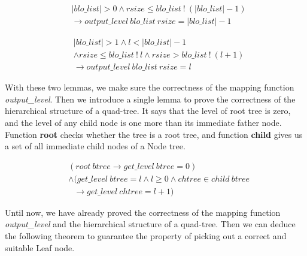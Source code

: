 \begin{lemma} 
\end{lemma}
\vspace{-7pt}
{\footnotesize
\begin{align*}
&\vert blo\_list \vert > 0 \wedge rsize \leq blo\_list\ !\ (\vert blo\_list \vert - 1) \\
&\longrightarrow output\_level\ blo\_list\ rsize = \vert blo\_list \vert - 1
\end{align*}
}
\vspace{-12pt}	

\begin{lemma} 
\end{lemma}
\vspace{-7pt}
{\footnotesize
\begin{align*}
&\vert blo\_list \vert > 1 \wedge l < \vert blo\_list \vert - 1 \\
&\wedge rsize \leq blo\_list\ !\ l \wedge rsize > blo\_list\ !\ (l + 1) \\
&\longrightarrow output\_level\ blo\_list\ rsize = l
\end{align*}
}
\vspace{-12pt}

With these two lemmas, we make sure the correctness of the mapping function \emph{output\_level}. Then we introduce a single lemma to prove the correctness of the hierarchical structure of a quad-tree. It says that the level of root tree is zero, and the level of any child node is one more than its immediate father node. Function \textbf{root} checks whether the tree is a root tree, and function \textbf{child} gives us a set of all immediate child nodes of a Node tree.

\begin{lemma} 
\end{lemma}
\vspace{-7pt}
{\footnotesize
\begin{align*}
&(root\ btree \longrightarrow get\_level\ btree = 0) \\
&\wedge (get\_level\ btree = l \wedge l \geq 0 \wedge chtree \in child\ btree \\
&\ \ \ \longrightarrow get\_level\ chtree = l + 1)
\end{align*}
}	
\vspace{-12pt}

Until now, we have already proved the correctness of the mapping function \emph{output\_level} and the hierarchical structure of a quad-tree. Then we can deduce the following theorem to guarantee the property of picking out a correct and suitable Leaf node.


